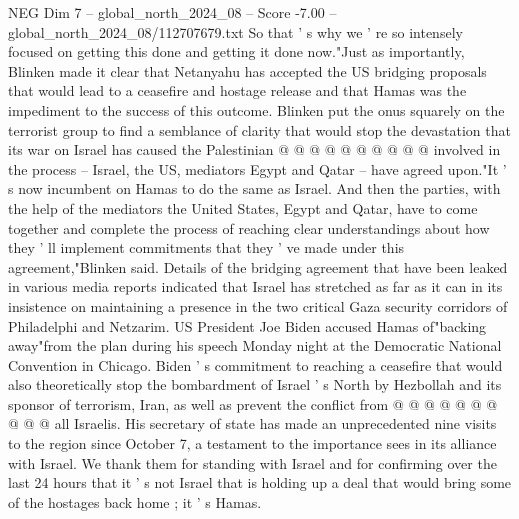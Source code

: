 \begin{textsample}{NEG Dim 7 – global\_north\_2024\_08 – Score -7.00 – global\_north\_2024\_08/112707679.txt}
So that ' s why we ' re so intensely focused on getting this done and getting it done now."Just as importantly, Blinken made it clear that Netanyahu has accepted the US bridging proposals that would lead to a ceasefire and hostage release and that Hamas was the impediment to the success of this outcome.
Blinken put the onus squarely on the terrorist group to find a semblance of clarity that would stop the devastation that its war on Israel has caused the Palestinian @ @ @ @ @ @ @ @ @ @ involved in the process -- Israel, the US, mediators Egypt and Qatar -- have agreed upon."It ' s now incumbent on Hamas to do the same as Israel.
And then the parties, with the help of the mediators the United States, Egypt and Qatar, have to come together and complete the process of reaching clear understandings about how they ' ll implement commitments that they ' ve made under this agreement,"Blinken said.
Details of the bridging agreement that have been leaked in various media reports indicated that Israel has stretched as far as it can in its insistence on maintaining a presence in the two critical Gaza security corridors of Philadelphi and Netzarim.
US President Joe Biden accused Hamas of"backing away"from the plan during his speech Monday night at the Democratic National Convention in Chicago.
Biden ' s commitment to reaching a ceasefire that would also theoretically stop the bombardment of Israel ' s North by Hezbollah and its sponsor of terrorism, Iran, as well as prevent the conflict from @ @ @ @ @ @ @ @ @ @ all Israelis.
His secretary of state has made an unprecedented nine visits to the region since October 7, a testament to the importance sees in its alliance with Israel.
We thank them for standing with Israel and for confirming over the last 24 hours that it ' s not Israel that is holding up a deal that would bring some of the hostages back home ; it ' s Hamas.

\end{textsample}

